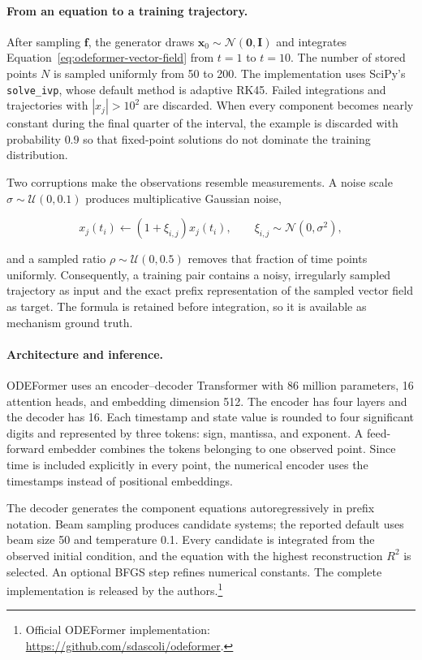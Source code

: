 \paragraph{From an equation to a training trajectory.}
After sampling $\mathbf f$, the generator draws
$\mathbf x_0\sim\mathcal N(\mathbf 0,\mathbf I)$ and integrates
Equation~\eqref{eq:odeformer-vector-field} from $t=1$ to $t=10$. The number of
stored points $N$ is sampled uniformly from 50 to 200. The implementation uses
SciPy's \texttt{solve\_ivp}, whose default method is adaptive RK45. Failed
integrations and trajectories with $|x_j|>10^2$ are discarded. When every
component becomes nearly constant during the final quarter of the interval,
the example is discarded with probability $0.9$ so that fixed-point solutions
do not dominate the training distribution.

Two corruptions make the observations resemble measurements. A noise scale
$\sigma\sim\mathcal U(0,0.1)$ produces multiplicative Gaussian noise,

\begin{equation}
x_j(t_i)\leftarrow(1+\xi_{i,j})x_j(t_i),
\qquad \xi_{i,j}\sim\mathcal N(0,\sigma^2),
\label{eq:odeformer-noise}
\end{equation}

and a sampled ratio $\rho\sim\mathcal U(0,0.5)$ removes that fraction of time
points uniformly. Consequently, a training pair contains a noisy, irregularly
sampled trajectory as input and the exact prefix representation of the sampled
vector field as target. The formula is retained before integration, so it is
available as mechanism ground truth.

\paragraph{Architecture and inference.}
ODEFormer uses an encoder--decoder Transformer with 86 million parameters, 16
attention heads, and embedding dimension 512. The encoder has four layers and
the decoder has 16. Each timestamp and state value is rounded to four
significant digits and represented by three tokens: sign, mantissa, and
exponent. A feed-forward embedder combines the tokens belonging to one observed
point. Since time is included explicitly in every point, the numerical encoder
uses the timestamps instead of positional embeddings.

The decoder generates the component equations autoregressively in prefix
notation. Beam sampling produces candidate systems; the reported default uses
beam size 50 and temperature 0.1. Every candidate is integrated from the
observed initial condition, and the equation with the highest reconstruction
$R^2$ is selected. An optional BFGS step refines numerical constants. The
complete implementation is released by the authors.\footnote{Official
ODEFormer implementation: \url{https://github.com/sdascoli/odeformer}.}

